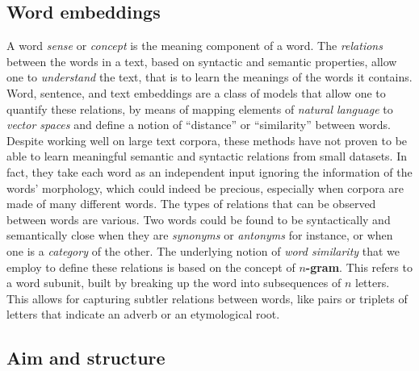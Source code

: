 \subsection{Word embeddings}
A word \emph{sense} or \emph{concept} is the meaning component of a word. The \textit{relations} between the words in a text, based on syntactic and semantic properties, allow one to \textit{understand} the text, that is to learn the meanings of the words it contains. Word, sentence, and text embeddings are a class of models that allow one to quantify these relations, by means of mapping elements of \textit{natural language} to \textit{vector spaces} and define a notion of ``distance'' or ``similarity'' between words. Despite working well on large text corpora, these methods have not proven to be able to learn meaningful semantic and syntactic relations from small datasets. In fact, they take each word as an independent input ignoring the information of the words' morphology, which could indeed be precious, especially when corpora are made of many different words. 
The types of relations that can be observed between words are various. Two words could be found to be syntactically and semantically close when they are \textit{synonyms} or \textit{antonyms} for instance, or when one is a \textit{category} of the other. The underlying notion of \textit{word similarity} that we employ to define these relations is based on the concept of \textbf{$n$-gram}. This refers to a word subunit, built by breaking up the word into subsequences of $n$ letters. This allows for capturing subtler relations between words, like pairs or triplets of letters that indicate an adverb or an etymological root. 


\subsection{Aim and structure}

